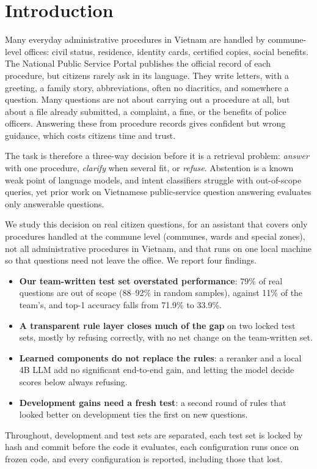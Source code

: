 \section{Introduction}

Many everyday administrative procedures in Vietnam are handled by commune-level offices: civil status, residence, identity cards,
certified copies, social benefits. The National Public Service Portal publishes the official record of each procedure\cite{dvcportal},
but citizens rarely ask in its language. They write letters, with a greeting, a family story, abbreviations, often no diacritics, and
somewhere a question. Many questions are not about carrying out a procedure at all, but about a file already submitted, a complaint, a
fine, or the benefits of police officers. Answering these from procedure records gives confident but wrong guidance, which costs citizens
time and trust\cite{kaplan2026,samson2026}.

The task is therefore a three-way decision before it is a retrieval problem: \emph{answer} with one procedure, \emph{clarify} when
several fit, or \emph{refuse}. Abstention is a known weak point of language models\cite{wen2025,kamath2020}, and intent classifiers
struggle with out-of-scope queries\cite{larson2019}, yet prior work on Vietnamese public-service question answering evaluates only
answerable questions\cite{phamduy2023}.

We study this decision on real citizen questions, for an assistant that covers only procedures handled at the commune level (communes,
wards and special zones), not all administrative procedures in Vietnam, and that runs on one local machine so that questions need not
leave the office\cite{jimenez2026}. We report four findings.

\begin{itemize}
\item \textbf{Our team-written test set overstated performance}: 79\% of real questions are out of scope (88--92\% in random samples),
against 11\% of the team's, and top-1 accuracy falls from 71.9\% to 33.9\%.
\item \textbf{A transparent rule layer closes much of the gap} on two locked test sets, mostly by refusing correctly, with no net change
on the team-written set.
\item \textbf{Learned components do not replace the rules}: a reranker and a local 4B LLM add no significant end-to-end gain, and letting
the model decide scores below always refusing.
\item \textbf{Development gains need a fresh test}: a second round of rules that looked better on development ties the first on new
questions.
\end{itemize}

Throughout, development and test sets are separated, each test set is locked by hash and commit before the code it evaluates, each
configuration runs once on frozen code, and every configuration is reported, including those that lost.
